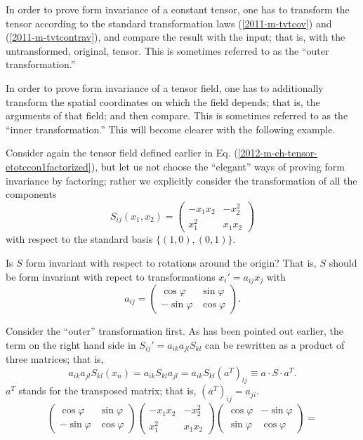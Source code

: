 In order to prove form invariance of a constant tensor,
one has to transform the tensor according to the standard transformation laws
(\ref{2011-m-tvtcov}) and (\ref{2011-m-tvtcontrav}), and compare the result with the input;
that is, with the untransformed, original, tensor.
This is sometimes referred to as the ``outer transformation.''


In order to prove form invariance of a tensor field,
one has to additionally transform the spatial coordinates on which the field depends;
that is, the arguments of that field; and then compare.
This is sometimes referred to as the ``inner transformation.''
This will become clearer with the following example.

{
\color{blue}
\bexample


Consider again the tensor field defined
earlier in Eq.
(\ref{2012-m-ch-tensor-etotccon1factorized}),
but let us not choose the ``elegant''
ways of proving form invariance by factoring; rather we explicitly
consider the transformation of all the  components
$$S_{ij}(x_1,x_2)
=
\begin{pmatrix}
 -x_1x_2 & - x_2^2  \\
 x_1^2 & x_1x_2
\end{pmatrix}
$$
with respect to the standard basis  $\{(1,0), (0,1)\}$.

Is $S$ form invariant with respect to rotations around the origin?
That is, $S$ should be form invariant with repect to transformations
$x_i' = a_{ij} x_j$
with
$$
a_{ij}=\begin{pmatrix}
 \cos \varphi & \sin \varphi  \\
  -\sin \varphi & \cos \varphi
\end{pmatrix}.
$$


Consider the ``outer'' transformation first.
As has been pointed out earlier,
the term on the right hand side in $
S_{ij}'= a_{ik}a_{jl}S_{kl}
$
can be rewritten as a product of three matrices; that is,
$$
a_{ik}a_{jl}S_{kl}\left(x_n\right)
=  a_{ik}S_{kl}a_{jl}
=  a_{ik}S_{kl}\left(a^T \right)_{lj}
\equiv a\cdot S\cdot a^T .
$$
$a^T$ stands for the transposed matrix; that is,
$(a^T)_{ij}=a_{ji}$.
$$
  \left(
    \begin{array}{cc}
      \cos \varphi  & \sin \varphi \\
      -\sin \varphi & \cos \varphi
    \end{array}
  \right)
  \left(
    \begin{array}{cc}
      -x_1x_2 & -x_2^2 \\
      x_1^2   & x_1x_2
    \end{array}
  \right)
  \left(
    \begin{array}{cc}
      \cos \varphi  & -\sin \varphi \\
      \sin \varphi & \cos \varphi
    \end{array}
  \right)=
$$

}
